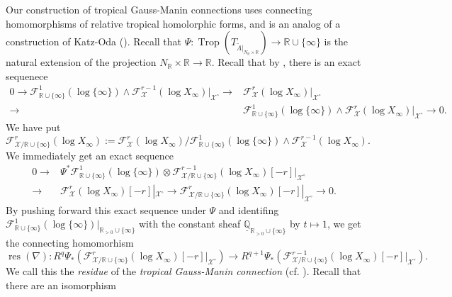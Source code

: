 \documentclass[12pt,a4]{amsart}
\def\R{\mathbb{R}}
\def\Q{\mathbb{Q}}
\def\F{\mathscr{F}}
\def\X{\mathscr{X}}
\def\res{\mathop{\mathrm{res}}\nolimits}
\def\Trop{\mathop{\mathrm{trop}}\nolimits}
\def\Trop{\mathop{\mathrm{Trop}}\nolimits}
\numberwithin{equation}{section}
\numberwithin{figure}{section}
\begin{document}
  Our construction of tropical Gauss-Manin connections 
   uses connecting homomorphisms of relative tropical homolorphic forms,
   and is an analog of a construction of Katz-Oda (\cite{KatzOdaOnthedifferentiationofDeRhamcohomologyclasseswithrespecttoparameters1968}).
  Recall that 
   $\Psi \colon \Trop (T_{\tilde{\Lambda} |_{ N_\R \times \R }})\to \R \cup \{ \infty \} $
   is 
   the natural extension of the projection 
   $ N_\R \times \R \to \R$.
  Recall that 
   by , 
     there is an exact sequenece 
    \begin{align*}
    0 \to \F^1_{\R \cup \{ \infty  \}} (\log \{ \infty  \}) 
     \wedge \F^{r-1}_\X (\log X_{\infty}) |_{ \X^{\circ} }
       \to &  \F^r_\X (\log X_{\infty}) |_{ \X^{\circ} } \\
       \to & \F^1_{\R \cup \{ \infty  \}} (\log \{ \infty  \}) 
     \wedge \F^{r}_\X (\log X_{\infty}) |_{ \X^{\circ} }
       \to 0 . 
    \end{align*}
  We have put 
   $$\F^r_{\X / \R \cup \{ \infty  \} } (\log X_{\infty} ) 
   :=
    \F^r_\X (\log X_{\infty}) / 
    \F^1_{\R \cup \{ \infty  \}} (\log \{ \infty  \}) 
    \wedge \F^{r-1}_\X (\log X_{\infty}).$$
  We immediately get an exact sequence 
    \begin{align*}
    0 \to & \Psi^* \F^1_{\R \cup \{ \infty  \}} (\log \{ \infty  \}) 
     \otimes 
      \F^{r-1}_{\X / \R \cup \{ \infty  \} } (\log X_{\infty} )  [-r]
      |_{ \X^{\circ} } \\
       \to &  \F^r_\X (\log X_{\infty}) [-r] |_{ \X^{\circ} } 
       \to  
      \F^{r}_{\X / \R \cup \{ \infty  \} } (\log X_{\infty} ) 
      [-r]
       |_{ \X^{\circ} }
       \to 0 . 
    \end{align*}
   By pushing forward this exact sequence 
   under $\Psi$
   and  
    identifing 
    $ \F^1_{\R \cup \{ \infty  \}} (\log \{ \infty  \}) |_{\R_{>0 } \cup \{ \infty \}}$
    with the constant sheaf $\underline{\Q}_{ \R_{>0 } \cup \{ \infty \} }$
    by $t \mapsto 1$,
    we get 
  the connecting homomorhism 
  $$ \res (\nabla) 
     \colon 
     R^q\Psi_*  (
      \F^{r}_{\X / \R \cup \{ \infty  \} } (\log X_{\infty} ) 
      [-r]
      |_{ \X^{\circ} })
      \to 
     R^{q+1}\Psi_* (\F^{r-1}_{\X / \R \cup \{ \infty  \} } (\log X_{\infty} ) 
     [-r]
       |_{ \X^{\circ} } ) .$$
   We call this the \emph{residue} of the \emph{tropical Gauss-Manin connection}
        (cf. \cite{KatzOdaOnthedifferentiationofDeRhamcohomologyclasseswithrespecttoparameters1968}). 
        Recall that 
    there are an isomorphism 
\end{document}
